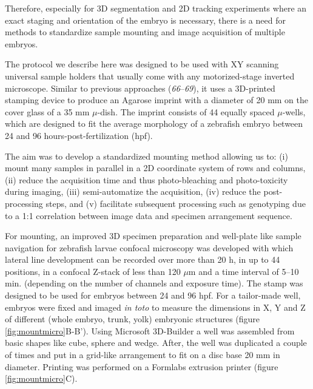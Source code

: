 \documentclass[11pt,singlespacinge,twoside]{reedthesis} %
\theoremstyle{definition}
\theoremstyle{definition}
\theoremstyle{definition}
\theoremstyle{remark}
\begin{document}
Therefore, especially for 3D segmentation and 2D tracking experiments where an exact staging and orientation of the embryo is necessary, there is a need for methods to standardize sample mounting and image acquisition of multiple embryos.

The protocol we describe here was designed to be used with XY scanning universal sample holders that usually come with any motorized-stage inverted microscope. Similar to previous approaches (\emph{66}--\emph{69}), it uses a 3D-printed stamping device to produce an Agarose imprint with a diameter of 20 mm on the cover glass of a 35 mm \(\mu\)-dish. The imprint consists of 44 equally spaced \(\mu\)-wells, which are designed to fit the average morphology of a zebrafish embryo between 24 and 96 hours-post-fertilization (hpf).

The aim was to develop a standardized mounting method allowing us to: (i) mount many samples in parallel in a 2D coordinate system of rows and columns, (ii) reduce the acquisition time and thus photo-bleaching and photo-toxicity during imaging, (iii) semi-automatize the acquisition, (iv) reduce the post-processing steps, and (v) facilitate subsequent processing such as genotyping due to a 1:1 correlation between image data and specimen arrangement sequence.

For mounting, an improved 3D specimen preparation and well-plate like sample navigation for zebrafish larvae confocal microscopy was developed with which lateral line development can be recorded over more than 20 h, in up to 44 positions, in a confocal Z-stack of less than 120 \(\mu\)m and a time interval of 5--10 min. (depending on the number of channels and exposure time). The stamp was designed to be used for embryos between 24 and 96 hpf. For a tailor-made well, embryos were fixed and imaged \emph{in toto} to measure the dimensions in X, Y and Z of different (whole embryo, trunk, yolk) embryonic structures (figure \ref{fig:mountmicro}B-B'). Using Microsoft 3D-Builder a well was assembled from basic shapes like cube, sphere and wedge. After, the well was duplicated a couple of times and put in a grid-like arrangement to fit on a disc base 20 mm in diameter. Printing was performed on a Formlabs extrusion printer (figure \ref{fig:mountmicro}C).
\end{document}
